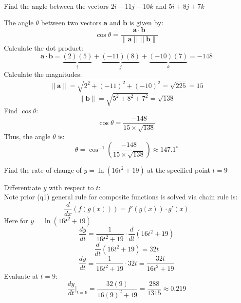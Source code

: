 \documentclass[a4paper, 12pt]{report}
\def\ni{blue!20!white}
\begin{document}
    \newpage
    \begin{tcolorbox}[title=\color{black}{\section{Q2}}, colback=white, colframe=\ni, boxrule=1mm, width=1\textwidth]
        Find the angle between the vectors \( 2 i-11 j-10 k \) and \( 5 i+8 j+7 k \)
    \end{tcolorbox}
    
    The angle \( \theta \) between two vectors \(\mathbf{a}\) and \(\mathbf{b}\) is given by:
    \[\cos \theta = \frac{\mathbf{a} \cdot \mathbf{b}}{\|\mathbf{a}\| \|\mathbf{b}\|}\]
    Calculate the dot product:
    \[\mathbf{a} \cdot \mathbf{b} = \underbrace{(2)(5)}_i + \underbrace{(-11)(8)}_j + \underbrace{(-10)(7)}_k = -148\]
    Calculate the magnitudes:
    \[\|\mathbf{a}\| = \sqrt{2^2 + (-11)^2 + (-10)^2} = \sqrt{225} = 15\]
    \[\|\mathbf{b}\| = \sqrt{5^2 + 8^2 + 7^2} = \sqrt{138}\]
    Find \(\cos \theta\):
    \[\cos \theta = \frac{-148}{15 \times \sqrt{138}}\]
    Thus, the angle \(\theta\) is:
    \[\boxed{\theta = \cos^{-1}\left(\frac{-148}{15 \times \sqrt{138}}\right) \approx 147.1^{\circ}}\]
    
    \newpage    
    \begin{tcolorbox}[title=\color{black}{\section{Q3}}, colback=white, colframe=\ni, boxrule=1mm, width=1\textwidth]
        Find the rate of change of \( y=\ln \left(16 t^{2}+19\right) \) at the specified point \( t=9 \)
    \end{tcolorbox}
        
    Differentiate \( y \) with respect to \( t \):\\[1em]
    Note prior (q1) general rule for composite functions is solved via chain rule is:
    \[\frac{d}{dx}(f(g(x))) = f'(g(x))\cdot g'(x)\]
    Here for $y=\ln \left(16 t^{2}+19\right)$
    \[\frac{dy}{dt} = \frac{1}{16t^2 + 19} \cdot \frac{d}{dt}(16t^2 + 19)\]
    \[\frac{d}{dt}(16t^2 + 19) = 32t\]
    \[\frac{dy}{dt} = \frac{1}{16t^2 + 19} \cdot 32t = \frac{32t}{16t^2 + 19}\]
    Evaluate at \( t = 9 \):
    \[\boxed{\frac{dy}{dt} \bigg|_{t=9} = \frac{32 (9)}{16(9)^2 + 19} = \frac{288}{1315} \approx 0.219}\]
    
\end{document}
